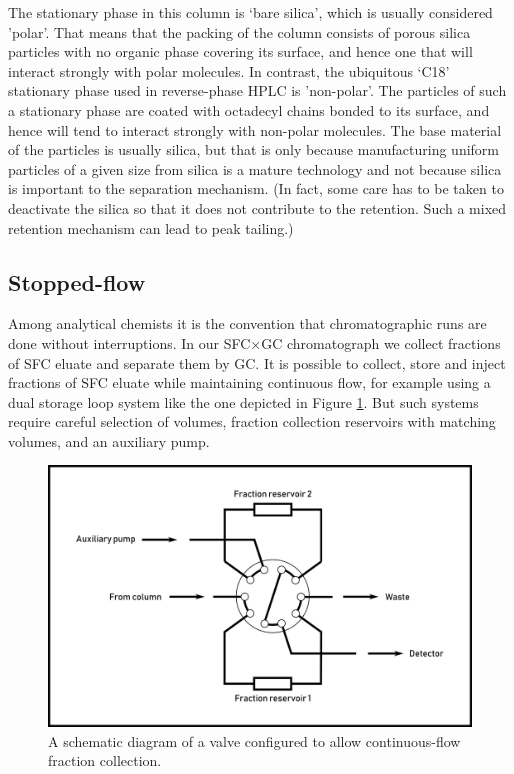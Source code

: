 The stationary phase in this column is `bare silica', which is usually
considered 'polar'. That means that the packing of the column consists of porous
silica particles with no organic phase covering its surface, and hence one that
will interact strongly with polar molecules. In contrast, the ubiquitous `C18'
stationary phase used in reverse-phase HPLC is 'non-polar'. The particles of
such a stationary phase are coated with octadecyl chains bonded to its surface,
and hence will tend to interact strongly with non-polar molecules. The base
material of the particles is usually silica, but that is only because
manufacturing uniform particles of a given size from silica is a mature
technology and not because silica is important to the separation mechanism. (In
fact, some care has to be taken to deactivate the silica so that it does not
contribute to the retention. Such a mixed retention mechanism can lead to peak
tailing.)

\subsection{Stopped-flow}
\label{sec:stopflow}

Among analytical chemists it is the convention that chromatographic runs are
done without interruptions. In our SFC×GC chromatograph we collect fractions of
SFC eluate and separate them by GC. It is possible to collect, store and inject
fractions of SFC eluate while maintaining continuous flow, for example using a
dual storage loop system like the one depicted in Figure
\ref{fig:continuousflow}. But such systems require careful selection of
volumes, fraction collection reservoirs with matching volumes, and an auxiliary
pump.

\begin{figure}
\centering
\includegraphics[width=\textwidth]{Figures/ContinuousFlowStopValve.pdf}
\decoRule

\caption[Schematic diagram of a continuous-flow valve.]{A schematic diagram of a
valve configured to allow continuous-flow fraction collection. }

\label{fig:continuousflow}
\end{figure}

